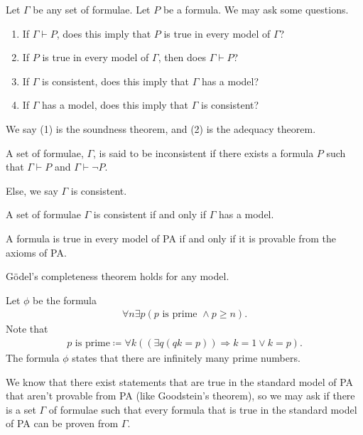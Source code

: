 \documentclass[10pt]{mypackage}
\begin{document}
Let $\Gamma$ be any set of formulae. Let $P$ be a formula. We may ask some questions.
\begin{enumerate}[(1)]
  \item If $\Gamma \vdash P$, does this imply that $P$ is true in every model of $\Gamma$?
  \item If $P$ is true in every model of $\Gamma$, then does $\Gamma \vdash P$?
  \item If $\Gamma$ is consistent, does this imply that $\Gamma$ has a model?
  \item If $\Gamma$ has a model, does this imply that $\Gamma$ is consistent?
\end{enumerate}
\begin{remark}
  We say (1) is the soundness theorem, and (2) is the adequacy theorem.
\end{remark}

\begin{definition}[Consistency]
A set of formulae, $\Gamma$, is said to be inconsistent if there exists a formula $P$ such that $\Gamma \vdash P$ and $\Gamma \vdash \lnot P$.\newline

Else, we say $\Gamma$ is consistent.
\end{definition}
\begin{theorem}
  A set of formulae $\Gamma$ is consistent if and only if $\Gamma$ has a model.
\end{theorem}
\begin{theorem}
  A formula is true in every model of PA if and only if it is provable from the axioms of PA.
\end{theorem}
\begin{remark}
  Gödel's completeness theorem holds for any model.
\end{remark}
\begin{example}
  Let $\phi$ be the formula
  \begin{align*}
    \forall n \exists p \left(p \text{ is prime } \wedge p\geq n\right).
  \end{align*}
  Note that
  \begin{align*}
    p\text{ is prime} \coloneq \forall k  \left(\left(\exists q\left(qk = p\right)\right) \Rightarrow k=1 \vee k=p\right).
  \end{align*}
  The formula $\phi$ states that there are infinitely many prime numbers.
\end{example}
We know that there exist statements that are true in the standard model of PA that aren't provable from PA (like Goodstein's theorem), so we may ask if there is a set $\Gamma$ of formulae such that every formula that is true in the standard model of PA can be proven from $\Gamma$.\newline
\end{document}
